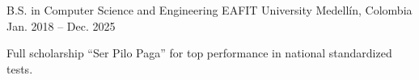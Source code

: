 
\begin{cventries}
  \cventry
    {B.S. in Computer Science and Engineering}
    {EAFIT University}
    {Medellín, Colombia}
    {Jan. 2018 -- Dec. 2025}
    {
      \begin{cvitems}
        \item {Full scholarship “Ser Pilo Paga” for top performance in national standardized tests.}
      \end{cvitems}
    }
\end{cventries}
